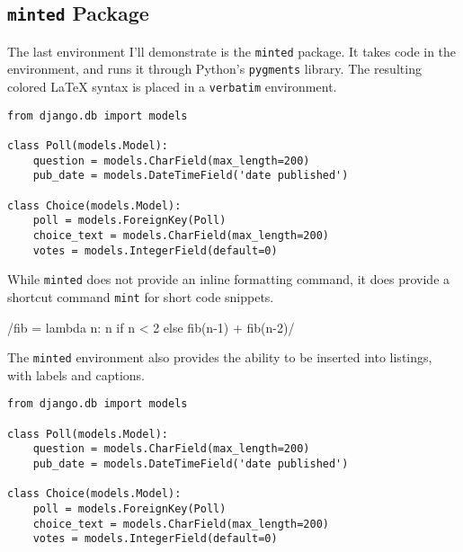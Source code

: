 
\subsection{\texttt{minted} Package}

The last environment I'll demonstrate is the \verb|minted| package. It takes code in the environment, and runs it through Python's \verb|pygments| library. The resulting colored \LaTeX{} syntax is placed in a \verb|verbatim| environment.

\begin{verbatim}
from django.db import models

class Poll(models.Model):
    question = models.CharField(max_length=200)
    pub_date = models.DateTimeField('date published')

class Choice(models.Model):
    poll = models.ForeignKey(Poll)
    choice_text = models.CharField(max_length=200)
    votes = models.IntegerField(default=0)
\end{verbatim}

While \verb|minted| does not provide an inline formatting command, it does provide a shortcut command \verb|mint| for short code snippets.

/fib = lambda n: n if n < 2 else fib(n-1) + fib(n-2)/


The \verb|minted| environment also provides the ability to be inserted into listings, with labels and captions.

\begin{listing}[H]
\begin{verbatim}
from django.db import models

class Poll(models.Model):
    question = models.CharField(max_length=200)
    pub_date = models.DateTimeField('date published')

class Choice(models.Model):
    poll = models.ForeignKey(Poll)
    choice_text = models.CharField(max_length=200)
    votes = models.IntegerField(default=0)
\end{verbatim}
\cprotect\caption[Listed Minted Example]{\verb|models.py| from Django Tutorial using Minted}
\label{code:django:models_basic_minted}
\end{listing}